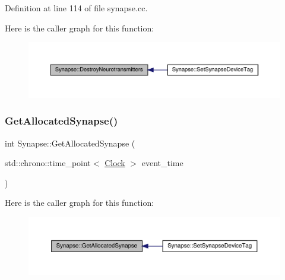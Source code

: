 Definition at line 114 of file synapse.\+cc.

Here is the caller graph for this function\+:\nopagebreak
\begin{figure}[H]
\begin{center}
\leavevmode
\includegraphics[width=350pt]{class_synapse_a58c882f356bc34c66a7cd2b345532ec9_icgraph}
\end{center}
\end{figure}
\mbox{\label{class_synapse_ad9a7225ede0ce4f64ecea9bc9cb49e20}} 
\subsubsection{\texorpdfstring{Get\+Allocated\+Synapse()}{GetAllocatedSynapse()}}
{\footnotesize\ttfamily int Synapse\+::\+Get\+Allocated\+Synapse (\begin{DoxyParamCaption}\item[{std\+::chrono\+::time\+\_\+point$<$ \hyperlink{universe_8h_a0ef8d951d1ca5ab3cfaf7ab4c7a6fd80}{Clock} $>$}]{event\+\_\+time }\end{DoxyParamCaption})}

Here is the caller graph for this function\+:\nopagebreak
\begin{figure}[H]
\begin{center}
\leavevmode
\includegraphics[width=350pt]{class_synapse_ad9a7225ede0ce4f64ecea9bc9cb49e20_icgraph}
\end{center}
\end{figure}
\mbox{\label{class_synapse_a1390c9fed5c01e712797818af1305ec0}} 
